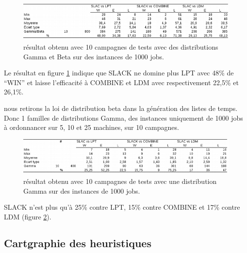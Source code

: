 \documentclass[a4paper,12pt]{report}
\theoremstyle{plain}				%
\theoremstyle{definition}				%
\begin{document}
\begin{figure}
{\centering
\includegraphics[width=\columnwidth]{6_Resultat_Reproduction10GammaBeta1000.png}
\caption{résultat obtenu avec 10 campagnes de tests avec des distributions Gamma et Beta sur des instances de 1000 jobs.}
\label{fig:resultatReproduction10GammaBeta1000}
\par}
\end{figure}

Le résultat en figure \ref{fig:resultatReproduction10GammaBeta1000} indique que 
  SLACK ne domine plus LPT avec 48\% de ``WIN'' et
  laisse l'efficacité à COMBINE et LDM avec respectivement 22,5\% et 26,1\%.


\bigskip
nous retirons la loi de distribution beta dans la génération des listes de temps.
Donc 1 familles de distributions Gamma, 
  des instances uniquement de 1000 jobs à ordonnancer sur 5, 10 et 25 machines,
  sur 10 campagnes.

\begin{figure}
{\centering
\includegraphics[width=\columnwidth]{7_Resultat_Reproduction10Gamma1000.png}
\caption{résultat obtenu avec 10 campagnes de tests avec une distribution Gamma sur des instances de 1000 jobs.}
\label{fig:resultatReproduction10Gamma1000}
\par}
\end{figure}

SLACK n'est plus qu'à 25\% contre LPT, 15\% contre COMBINE et 17\% contre LDM (figure \ref{fig:resultatReproduction10Gamma1000}).


\subsection{Cartgraphie des heuristiques}
\label{ssec:resultatsCartographie}
\end{document}
